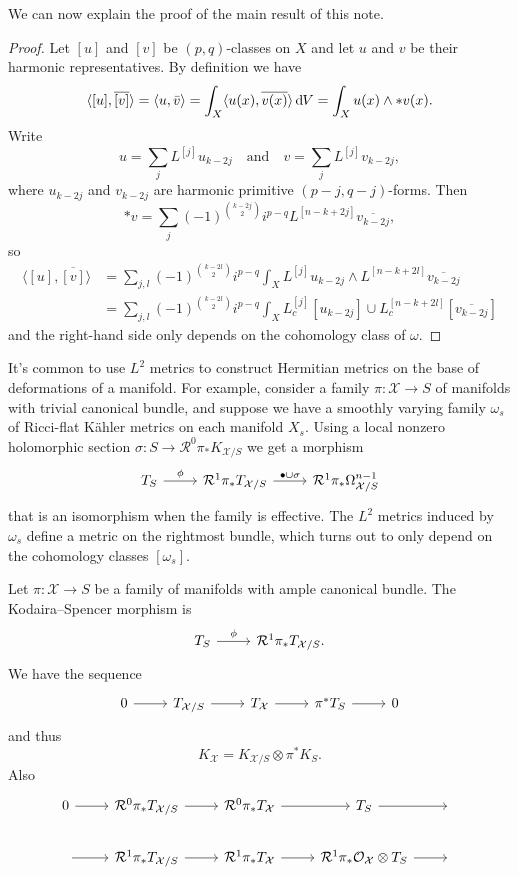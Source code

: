 \documentclass[11pt]{article}
\theoremstyle{definition}
\newcommand{\cc}[1]{\mathcal{#1}}
\def\^#1{^{[#1]}}
\def\ov#1{\overline{#1}}
\def\<{\langle}
\def\>{\rangle}
\def\dV{\mathrm{d}\mkern-1mu V}
\begin{document}
We can now explain the proof of the main result of this note.

\begin{proof}
Let $[u]$ and $[v]$ be $(p,q)$-classes on $X$ and let $u$ and $v$ be their harmonic representatives.
By definition we have
\[
\< [u], \ov{[v]} \>
= \< u, \bar v \>
= \int_X \< u(x), \ov{v(x)} \> \, \dV
= \int_X u(x) \wedge * v(x).
\]
Write
\[
u = \sum_j L\^j u_{k-2j}
\quad\text{and}\quad
v = \sum_j L\^j v_{k-2j},
\]
where $u_{k-2j}$ and $v_{k-2j}$ are harmonic primitive $(p-j,q-j)$-forms.
Then
\[
*v = \sum_j (-1)^{\binom{k-2j}{2}} i^{p-q} L\^{n-k+2j} \ov{v_{k-2j}},
\]
so
\begin{align*}
\< [u], \ov{[v]} \>
&= \sum_{j,l} (-1)^{\binom{k-2l}{2}} i^{p-q} \int_X L\^j u_{k-2j} \wedge L\^{n-k+2l} \ov{v_{k-2j}}
\\
&= \sum_{j,l} (-1)^{\binom{k-2l}{2}} i^{p-q} \int_X L_c\^j [u_{k-2j}] \cup L_c\^{n-k+2l} [\ov{v_{k-2j}}]
\end{align*}
and the right-hand side only depends on the cohomology class of $\omega$.
\end{proof}


It's common to use $L^2$ metrics to construct Hermitian metrics on the base of deformations of a manifold.
For example, consider a family $\pi : \cc X \to S$ of manifolds with trivial canonical bundle, and suppose we have a smoothly varying family $\omega_s$ of Ricci-flat K\"ahler metrics on each manifold $X_s$.
Using a local nonzero holomorphic section $\sigma : S \to \cc R^0 \pi_* K_{\cc X / S}$ we get a morphism
\[
\begin{tikzcd}
T_S \ar[r,"\phi"] &
\cc R^1 \pi_* T_{\cc X/S} \ar[r,"\bullet \cup \sigma"] &
\cc R^1 \pi_* \Omega_{\cc X/S}^{n-1}
\end{tikzcd}
\]
that is an isomorphism when the family is effective.
The $L^2$ metrics induced by $\omega_s$ define a metric on the rightmost bundle, which turns out to only depend on the cohomology classes $[\omega_s]$.

Let $\pi : \cc X \to S$ be a family of manifolds with ample canonical bundle.
The Kodaira--Spencer morphism is
\[
\begin{tikzcd}
T_S \ar[r,"\phi"] &
\cc R^1 \pi_* T_{\cc X/S}.
\end{tikzcd}
\]
We have the sequence
\[
\begin{tikzcd}
0 \ar[r] & 
T_{\cc X/S} \ar[r] &
T_{\cc X} \ar[r] &
\pi^* T_S \ar[r] &
0
\end{tikzcd}
\]
and thus
\[
K_{\cc X} = K_{\cc X / S} \otimes \pi^* K_S.
\]
Also
\[
\begin{tikzcd}
0 \ar[r] & 
\cc R^0 \pi_* T_{\cc X/S} \ar[r] &
\cc R^0 \pi_* T_{\cc X} \ar[r] &
T_{S} \ar[r] &
\phantom{.}
\\
\ar[r] &
\cc R^1 \pi_* T_{\cc X/S} \ar[r] &
\cc R^1 \pi_* T_{\cc X} \ar[r] &
\cc R^1 \pi_* \cc O_{\cc X} \otimes T_{S} \ar[r] &
\phantom{.}
\end{tikzcd}
\]
\end{document}
